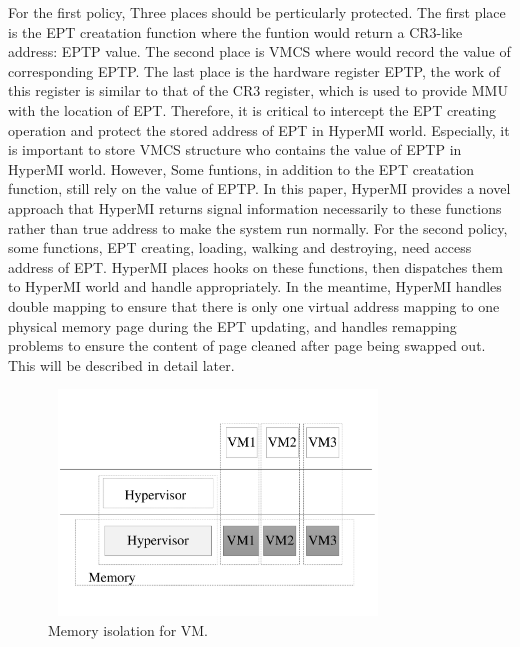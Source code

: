 \documentclass[conference]{IEEEtran}
\begin{document}
For the first policy, Three places should be perticularly protected. The first place is the EPT creatation function where the funtion would return a CR3-like address: EPTP value. The second place is VMCS where would record the value of corresponding EPTP. The last place is the hardware register EPTP, the work of this register is similar to that of the CR3 register, which is used to provide MMU with the location of EPT. 
Therefore, it is critical to intercept the EPT creating operation and protect the stored address of EPT in HyperMI world. Especially, it is important to store VMCS structure who contains the value of EPTP in HyperMI world. 
However, Some funtions, in addition to the EPT creatation function, still rely on the value of EPTP. In this paper, HyperMI provides a novel approach that HyperMI returns signal information necessarily to these functions rather than true address to make the system run normally. 
For the second policy, some functions, EPT creating, loading, walking and destroying, need access address of EPT. HyperMI places hooks on these functions, then dispatches them to HyperMI world and handle appropriately. In the meantime, HyperMI handles double mapping to ensure that there is only one virtual address mapping to one physical memory page during the EPT updating, and handles remapping problems to ensure the content of page cleaned after page being swapped out. This will be described in detail later.
\begin{figure}
\centerline{\includegraphics[width=9cm, height=6cm]{pdfvmcs3.pdf}}%
\caption{Memory isolation for VM.} \label{fig3}
\end{figure}
\end{document}
